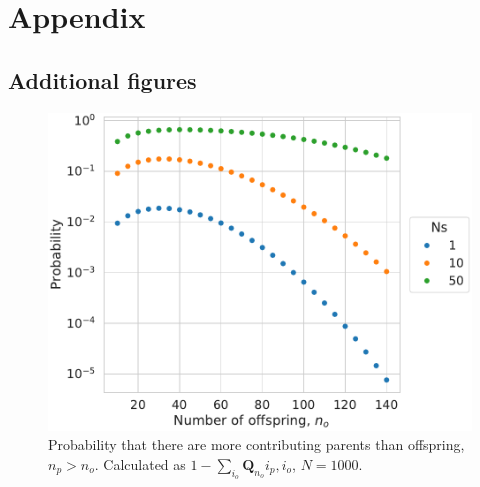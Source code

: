 \documentclass[review]{elsarticle}
\begin{document}
\section{Appendix}

\subsection{Additional figures}
\label{subsec_apx_figures}


\begin{figure}[H]
  \centering
  \includegraphics[width=\textwidth]{fig/missing.pdf}
  \caption{Probability that there are more contributing parents than offspring, $n_p > n_o$.
    Calculated as $1-\sum_{i_o} \mathbf{Q}_{n_o}{i_p, i_o}$, $N=1000$.}
  \label{fig_apx_missing}
\end{figure}


\end{document}
